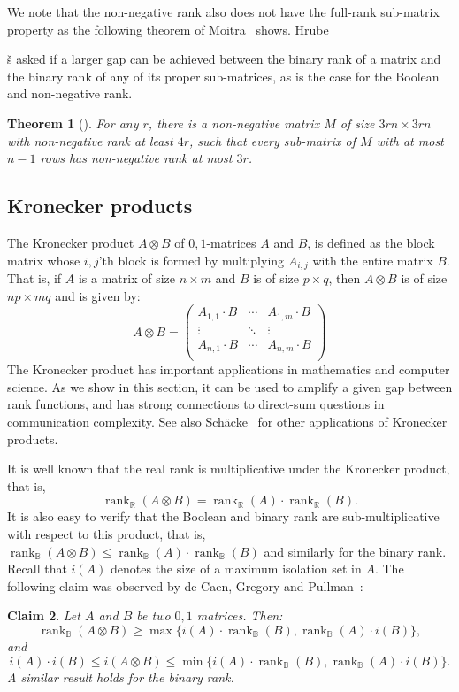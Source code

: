 \documentclass[11pt]{article}
\newtheorem{theorem}{Theorem}
\newtheorem{claim}[theorem]{Claim}
\newcommand{\rank}{\mathop{\mathrm{rank}}}
\newcommand{\Rbool}{{\rank}_\mathbb{B}}
\newcommand{\Rreal}{{\rank}_\mathbb{R}}
\begin{document}
{We note that the non-negative rank also does not have the full-rank sub-matrix property as the following theorem of Moitra~\cite{moitra2016almost} shows.
Hrube{\v{s} asked if a larger gap can be achieved between the binary rank of a matrix and the binary rank of any of its proper sub-matrices,
as is the case for the Boolean and non-negative rank.

\begin{theorem}[\cite{moitra2016almost}]
\label{theo-moitra}
For any $r$, there is a non-negative matrix $M$ of size $3rn \times 3rn$ with non-negative rank  at least $4r$,
such that every sub-matrix of $M$ with at most $n-1$ rows has non-negative rank at most $3r$.
\end{theorem}



\subsection{Kronecker products}
\label{subsec-kronecker}

The Kronecker product $A \otimes B$ of $0,1$-matrices $A$ and $B$, is defined as the block matrix whose $i,j$'th block is formed by multiplying  $A_{i,j}$
with the entire matrix $B$. That is, if $A$ is a matrix of size $n \times m$ and $B$ is of size $p \times q$, then $ A \otimes B$ is of size $np \times mq$ and is given by:
$$
A \otimes B =
\left(
  \begin{array}{ccc}
    A_{1,1}\cdot B & \cdots & A_{1,m} \cdot B \\
    \vdots & \ddots & \vdots \\
    A_{n,1}\cdot B & \cdots & A_{n,m} \cdot B \\
  \end{array}
\right)
$$
The Kronecker product has important applications in mathematics and computer science.
As we show in this section, it can be used to amplify a given gap between rank functions, and has strong connections to direct-sum questions in communication complexity.
See also Sch\"{a}cke~\cite{schacke2004kronecker} for other applications of Kronecker products.

It is well known that the real rank is multiplicative under the Kronecker product, that is,
$$\Rreal(A \otimes B) = \Rreal(A)\cdot \Rreal(B).$$
It is also easy to  verify that the Boolean and binary rank are sub-multiplicative with respect to this product, that is,
$\Rbool(A \otimes B) \leq  \Rbool(A) \cdot \Rbool(B)$ and similarly for the binary rank.
Recall that $i(A)$ denotes the size of a maximum isolation set in $A$. The following claim was observed by de Caen, Gregory and Pullman~\cite{de1988boolean}:
\begin{claim}
\label{amplify-gap}
Let $A$ and $B$ be two $0,1$ matrices. Then:
$$\Rbool(A \otimes B) \geq \max\{i(A) \cdot \Rbool(B),\Rbool(A) \cdot i(B)\},$$
and
$$
i(A)\cdot i(B) \leq i(A \otimes B) \leq \min \{i(A)\cdot \Rbool(B), \Rbool(A) \cdot i(B)\}.
$$
A similar result holds for the binary rank.
\end{claim}

}}
\end{document}
